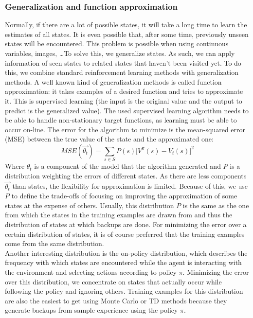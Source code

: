 \documentclass[a4paper]{article}
\begin{document}
\subsubsection{Generalization and function approximation}
Normally, if there are a lot of possible states, it will take a long time to learn the estimates of all states. It is even possible that, after some time, previously unseen states will be encountered. This problem is possible when using continuous variables, images, \dots To solve this, we generalize states. As such, we can apply information of seen states to related states that haven't been visited yet. To do this, we combine standard reinforcement learning methods with generalization methods. A well known kind of generalization methods is called function approximation: it takes examples of a desired function and tries to approximate it. This is supervised learning (the input is the original value and the output to predict is the generalized value). The used supervised learning algorithm needs to be able to handle non-stationary target functions, as learning must be able to occur on-line. The error for the algorithm to minimize is the mean-squared error (MSE) between the true value of the state and the approximated one:
\begin{equation}
MSE(\overrightarrow{\theta_t}) = \sum_{s \in S} P(s) \big[ V^{\pi}(s) - V_t(s) \big]^2 
\end{equation}
Where $\theta_t$ is a component of the model that the algorithm generated and $P$ is a distribution weighting the errors of different states. As there are less components $\overrightarrow{\theta_t}$ than states, the flexibility for approximation is limited. Because of this, we use $P$ to define the trade-offs of focusing on improving the approximation of some states at the expense of others. Usually, this distribution $P$ is the same as the one from which the states in the training examples are drawn from and thus the distribution of states at which backups are done. For minimizing the error over a certain distribution of states, it is of course preferred that the training examples come from the same distribution.\\
Another interesting distribution is the on-policy distribution, which describes the frequency with which states are encountered while the agent is interacting with the environment and selecting actions according to policy $\pi$. Minimizing the error over this distribution, we concentrate on states that actually occur while following the policy and ignoring others. Training examples for this distribution are also the easiest to get using Monte Carlo or TD methods because they generate backups from sample experience using the policy $\pi$.\\
\end{document}
